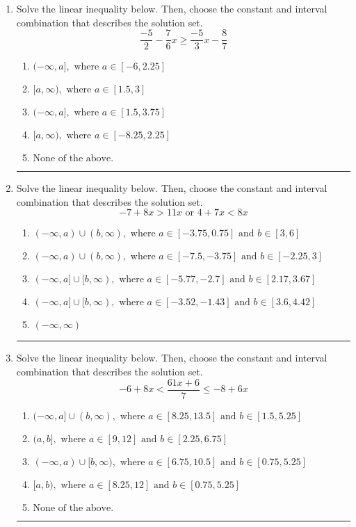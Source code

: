 \documentclass[14pt]{extbook}
\newcommand{\litem}[1]{\item#1\hspace*{-1cm}\rule{\textwidth}{0.4pt}}
\begin{document}
\begin{enumerate}
{\begin{enumerate}[label=\Alph*.]
\end{enumerate} }
\litem{
Solve the linear inequality below. Then, choose the constant and interval combination that describes the solution set.\[ \frac{-5}{2} - \frac{7}{6} x \geq \frac{-5}{3} x - \frac{8}{7} \]\begin{enumerate}[label=\Alph*.]
\item \( (-\infty, a], \text{ where } a \in [-6, 2.25] \)
\item \( [a, \infty), \text{ where } a \in [1.5, 3] \)
\item \( (-\infty, a], \text{ where } a \in [1.5, 3.75] \)
\item \( [a, \infty), \text{ where } a \in [-8.25, 2.25] \)
\item \( \text{None of the above}. \)

\end{enumerate} }
\litem{
Solve the linear inequality below. Then, choose the constant and interval combination that describes the solution set.\[ -7 + 8 x > 11 x \text{ or } 4 + 7 x < 8 x \]\begin{enumerate}[label=\Alph*.]
\item \( (-\infty, a) \cup (b, \infty), \text{ where } a \in [-3.75, 0.75] \text{ and } b \in [3, 6] \)
\item \( (-\infty, a) \cup (b, \infty), \text{ where } a \in [-7.5, -3.75] \text{ and } b \in [-2.25, 3] \)
\item \( (-\infty, a] \cup [b, \infty), \text{ where } a \in [-5.77, -2.7] \text{ and } b \in [2.17, 3.67] \)
\item \( (-\infty, a] \cup [b, \infty), \text{ where } a \in [-3.52, -1.43] \text{ and } b \in [3.6, 4.42] \)
\item \( (-\infty, \infty) \)

\end{enumerate} }
\litem{
Solve the linear inequality below. Then, choose the constant and interval combination that describes the solution set.\[ -6 + 8 x < \frac{61 x + 6}{7} \leq -8 + 6 x \]\begin{enumerate}[label=\Alph*.]
\item \( (-\infty, a] \cup (b, \infty), \text{ where } a \in [8.25, 13.5] \text{ and } b \in [1.5, 5.25] \)
\item \( (a, b], \text{ where } a \in [9, 12] \text{ and } b \in [2.25, 6.75] \)
\item \( (-\infty, a) \cup [b, \infty), \text{ where } a \in [6.75, 10.5] \text{ and } b \in [0.75, 5.25] \)
\item \( [a, b), \text{ where } a \in [8.25, 12] \text{ and } b \in [0.75, 5.25] \)
\item \( \text{None of the above.} \)


\end{enumerate}}
\end{enumerate}
\end{document}
